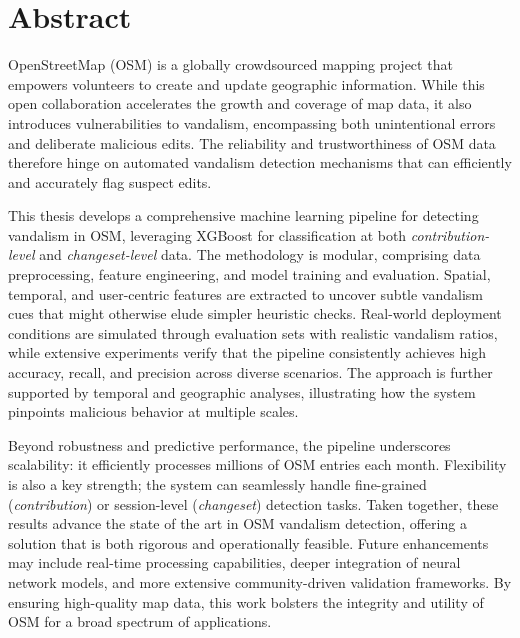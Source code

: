 \documentclass[
    13pt, %
    a4paper, %
    listof=totoc, %
    bibliography=totoc, %
    index=totoc, %
    headsepline
]{scrreprt}
\begin{document}
\newpage
\section*{\LARGE Abstract}

OpenStreetMap (OSM) is a globally crowdsourced mapping project that empowers volunteers to create and update geographic information. While this open collaboration accelerates the growth and coverage of map data, it also introduces vulnerabilities to vandalism, encompassing both unintentional errors and deliberate malicious edits. The reliability and trustworthiness of OSM data therefore hinge on automated vandalism detection mechanisms that can efficiently and accurately flag suspect edits.

This thesis develops a comprehensive machine learning pipeline for detecting vandalism in OSM, leveraging XGBoost for classification at both \emph{contribution-level} and \emph{changeset-level} data. The methodology is modular, comprising data preprocessing, feature engineering, and model training and evaluation. Spatial, temporal, and user-centric features are extracted to uncover subtle vandalism cues that might otherwise elude simpler heuristic checks. Real-world deployment conditions are simulated through evaluation sets with realistic vandalism ratios, while extensive experiments verify that the pipeline consistently achieves high accuracy, recall, and precision across diverse scenarios. The approach is further supported by temporal and geographic analyses, illustrating how the system pinpoints malicious behavior at multiple scales. 

Beyond robustness and predictive performance, the pipeline underscores scalability: it efficiently processes millions of OSM entries each month. Flexibility is also a key strength; the system can seamlessly handle fine-grained (\emph{contribution}) or session-level (\emph{changeset}) detection tasks. Taken together, these results advance the state of the art in OSM vandalism detection, offering a solution that is both rigorous and operationally feasible. Future enhancements may include real-time processing capabilities, deeper integration of neural network models, and more extensive community-driven validation frameworks. By ensuring high-quality map data, this work bolsters the integrity and utility of OSM for a broad spectrum of applications. 

\newpage
\tableofcontents
\newpage

\setcounter{page}{1}
\end{document}
